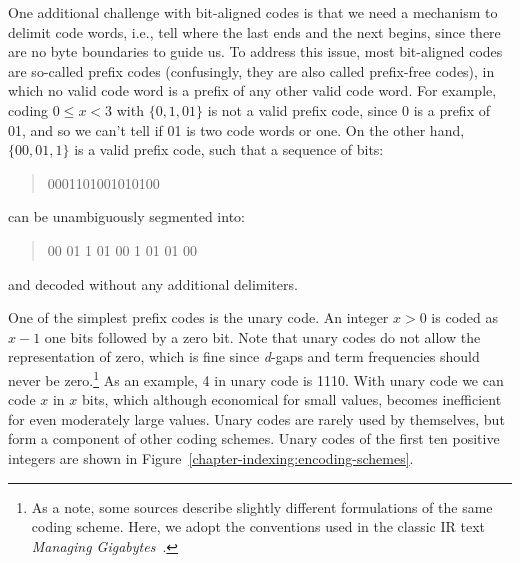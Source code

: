 One additional challenge with bit-aligned codes is that we need a
mechanism to delimit code words, i.e., tell where the last ends and
the next begins, since there are no byte boundaries to guide us.  To
address this issue, most bit-aligned codes are so-called prefix codes
(confusingly, they are also called prefix-free codes), in which no
valid code word is a prefix of any other valid code word.  For
example, coding $0 \leq x < 3$ with $\{0, 1, 01\}$ is not a valid
prefix code, since 0 is a prefix of 01, and so we can't tell if 01 is
two code words or one.  On the other hand, $\{00, 01, 1\}$ is a valid
prefix code, such that a sequence of bits:

\begin{quote}
0001101001010100
\end{quote}

\noindent can be unambiguously segmented into:

\begin{quote}
00 01 1 01 00 1 01 01 00
\end{quote}

\noindent and decoded without any additional delimiters.

One of the simplest prefix codes is the unary code.  An integer $x>0$
is coded as $x-1$ one bits followed by a zero bit.  Note that unary
codes do not allow the representation of zero, which is fine since
\emph{d}-gaps and term frequencies should never be zero.\footnote{As a
  note, some sources describe slightly different formulations of the
  same coding scheme.  Here, we adopt the conventions used in the
  classic IR text \emph{Managing Gigabytes}~\cite{Witten_etal_1999}.}
As an example, 4 in unary code is 1110.  With unary code we can code
$x$ in $x$ bits, which although economical for small values, becomes
inefficient for even moderately large values.  Unary codes are rarely
used by themselves, but form a component of other coding schemes.
Unary codes of the first ten positive integers are shown in
Figure~\ref{chapter-indexing:encoding-schemes}.

